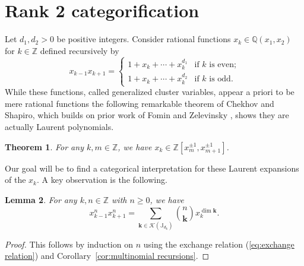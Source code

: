 \documentclass{amsart}
\numberwithin{equation}{section}
\newtheorem{theorem}{Theorem}[section]
\newtheorem{lemma}[theorem]{Lemma}
\theoremstyle{definition}
\def\JJ{\mathbb{J}}
\def\QQ{\mathbb{Q}}
\def\ZZ{\mathbb{Z}}
\def\bfk{\mathbf{k}}
\def\cK{\mathcal{K}}
\def\dim{\operatorname{dim}}
\renewcommand{\eqref}[1]{{\rm (\ref{#1})}}
\begin{document}
\section{Rank 2 categorification}\label{sec:rank 2}
Let $d_1,d_2>0$ be positive integers.  Consider rational functions $x_k\in\QQ(x_1,x_2)$ for $k\in\ZZ$ defined recursively by
\begin{equation}\label{eq:exchange relation}
  x_{k-1}x_{k+1}=\begin{cases}1+x_k+\cdots+x_k^{d_1} & \text{if $k$ is even;}\\1+x_k+\cdots+x_k^{d_2} & \text{if $k$ is odd.}\end{cases}
\end{equation}
While these functions, called generalized cluster variables, appear a priori to be mere rational functions the following remarkable theorem of Chekhov and Shapiro, which builds on prior work of Fomin and Zelevinsky \cite{fomin-zelevinsky1}, shows they are actually Laurent polynomials.
\begin{theorem}\cite{chekhov-shapiro}
  For any $k,m\in\ZZ$, we have $x_k\in\ZZ[x_m^{\pm1},x_{m+1}^{\pm1}]$.
\end{theorem}
Our goal will be to find a categorical interpretation for these Laurent expansions of the $x_k$.  A key observation is the following.

\begin{lemma}\label{le:multinomial powers}
  For any $k,n\in\ZZ$ with $n\ge0$, we have 
  \begin{equation}\label{eq:multinomial powers}
    x_{k-1}^nx_{k+1}^n=\sum\limits_{\bfk\in\cK(\JJ_{d_k})} {n\choose\bfk} x_k^{\dim\bfk}.
  \end{equation}
\end{lemma}
\begin{proof}
  This follows by induction on $n$ using the exchange relation \eqref{eq:exchange relation} and Corollary~\ref{cor:multinomial recursions}.
\end{proof}
\end{document}
